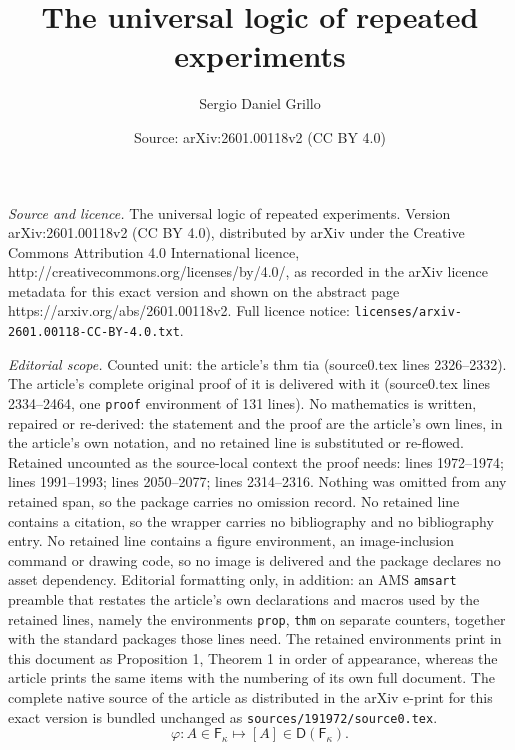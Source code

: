 \documentclass[10pt,a4paper]{amsart}
\title{The universal logic of repeated experiments}
\author{Sergio Daniel Grillo}
\date{Source: arXiv:2601.00118v2 (CC BY 4.0)}
\begin{document}
\maketitle

\noindent\emph{Source and licence.} The universal logic of repeated experiments. Version arXiv:2601.00118v2 (CC BY 4.0), distributed by arXiv under the Creative Commons Attribution 4.0 International licence, http://creativecommons.org/licenses/by/4.0/, as recorded in the arXiv licence metadata for this exact version and shown on the abstract page https://arxiv.org/abs/2601.00118v2. Full licence notice: \texttt{licenses/arxiv-2601.00118-CC-BY-4.0.txt}.\par\smallskip

\noindent\textit{Editorial scope.} Counted unit: the article's thm tia (source0.tex lines 2326--2332). The article's complete original proof of it is delivered with it (source0.tex lines 2334--2464, one \texttt{proof} environment of 131 lines). No mathematics is written, repaired or re-derived: the statement and the proof are the article's own lines, in the article's own notation, and no retained line is substituted or re-flowed.  Retained uncounted as the source-local context the proof needs: lines 1972--1974; lines 1991--1993; lines 2050--2077; lines 2314--2316.  Nothing was omitted from any retained span, so the package carries no omission record.  No retained line contains a citation, so the wrapper carries no bibliography and no bibliography entry.  No retained line contains a figure environment, an image-inclusion command or drawing code, so no image is delivered and the package declares no asset dependency.  Editorial formatting only, in addition: an AMS \texttt{amsart} preamble that restates the article's own declarations and macros used by the retained lines, namely the environments \texttt{prop}, \texttt{thm} on separate counters, together with the standard packages those lines need.  The retained environments print in this document as Proposition 1, Theorem 1 in order of appearance, whereas the article prints the same items with the numbering of its own full document.  The complete native source of the article as distributed in the arXiv e-print for this exact version is bundled unchanged as \texttt{sources/191972/source0.tex}.
\begin{equation}
\varphi:A\in\mathsf{\mathsf{F}_{\kappa}}\mapsto\left[A\right]\in\mathsf{D}\left(\mathsf{F}_{\kappa}\right).\label{fial}
\end{equation}
\end{document}

